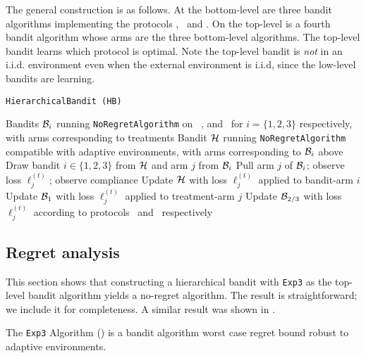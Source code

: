 The general construction is as follows. At the bottom-level are three bandit algorithms implementing the protocols \chosen, \actual\, and \comply. On the top-level is a fourth bandit algorithm whose arms are the three bottom-level algorithms. The top-level bandit learns which protocol is optimal. 
Note the top-level bandit is \emph{not} in an i.i.d. environment even when the external environment is i.i.d, since the low-level bandits are learning.
 
\begin{algorithm}
   \caption{\texttt{HierarchicalBandit (HB)}}
   \label{alg:hier-exp}
   \begin{algorithmic}   
   	 Bandits ${\mathcal B}_i$ running \texttt{NoRegretAlgorithm} on \comply\, \chosen, and \actual\, for $i =\{1,2,3\}$ respectively, with arms corresponding to treatments
   	 Bandit ${\mathcal H}$ running \texttt{NoRegretAlgorithm} compatible with adaptive environments, with arms corresponding to ${\mathcal B}_i$ above
	\STATE Draw bandit $i\in\{1,2,3\}$ from ${\mathcal H}$ and arm $j$ from ${\mathcal B}_i$
	\STATE Pull arm $j$ of ${\mathcal B}_i$; observe loss $\ell_j^{(t)}$; observe compliance
	\STATE Update ${\mathcal H}$ with loss $\ell_j^{(t)}$ applied to bandit-arm $i$
	\STATE Update ${\mathcal B}_1$ with loss $\ell_j^{(t)}$ applied to treatment-arm $j$
	\ENDIF
	\STATE Update ${\mathcal B}_{2/3}$ with loss $\ell_j^{(t)}$ according to protocols \chosen\, and \actual\, respectively
   	\ENDFOR

       	\end{algorithmic}
\end{algorithm}          

\subsection{Regret analysis}

This section shows that constructing a hierarchical bandit with \texttt{Exp3} as the top-level bandit algorithm yields a no-regret algorithm. The result is straightforward; we include it for completeness. A similar result was shown in \cite{chang:05}. 

The \texttt{Exp3} Algorithm (\cite{auer:02b}) is a bandit algorithm worst case regret bound robust to adaptive environments.


